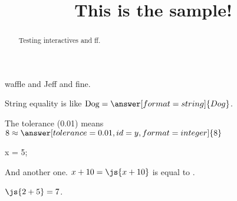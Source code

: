 \documentclass{ximera}
\title{This is the sample!}
\begin{document}
\begin{abstract}
Testing interactives and ff.
\end{abstract}

\maketitle

waffle and Jeff and fine.


\begin{problem}
  String equality is like $\mbox{Dog} = \answer[format=string]{Dog}$.
\end{problem}

\begin{problem}
  The tolerance (0.01) means $8 \approx \answer[tolerance=0.01,id=y,format=integer]{8}$
  
  \begin{feedback}[72]
  \end{feedback}
\end{problem}

\begin{javascript}
x = 5;
\end{javascript}

And another one.  $x + 10 = \js{x+10}$ is equal to .

$\js{2+5} = 7$.
\end{document}
